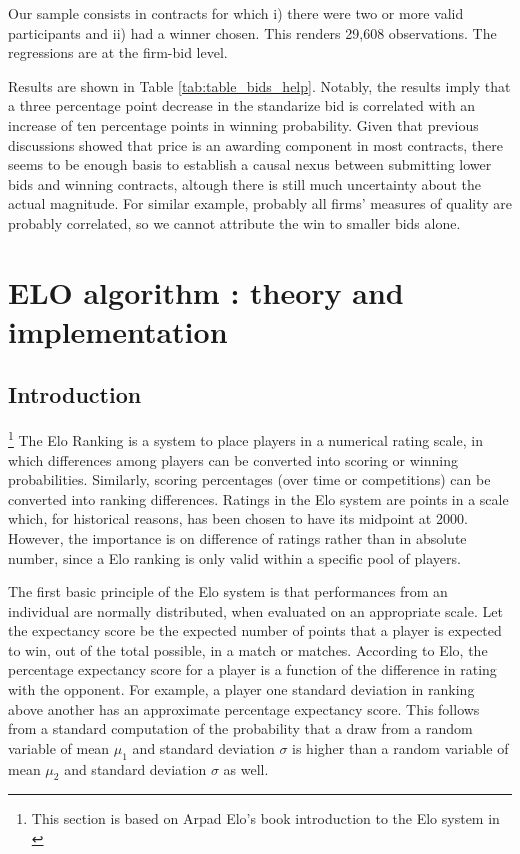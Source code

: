 Our sample consists in contracts for which i) there were two or more valid participants and ii) had a winner chosen. This renders 29,608 observations. The regressions are at the firm-bid level.

Results are shown in Table \ref{tab:table_bids_help}. Notably, the results imply that a three percentage point decrease in the standarize bid is correlated with an increase of ten percentage points in winning probability. Given that previous discussions showed that price is an awarding component in most contracts, there seems to be enough basis to establish a causal nexus between submitting lower bids and winning contracts, altough there is still much uncertainty about the actual magnitude. For similar  example, probably all firms' measures of quality are probably correlated, so we cannot attribute the win to smaller bids alone.



\clearpage
\section{ELO algorithm : theory and implementation}
\label{section:eloappendix}
\subsection{Introduction}\footnote{This section is based on Arpad Elo's book introduction to the Elo system in \citep{elo1978rating}}
The Elo Ranking is a system to place players in a numerical rating scale, in which differences among players can be converted into scoring or winning probabilities. Similarly, scoring percentages (over time or competitions) can be converted into ranking differences. Ratings in the Elo system are points in a scale which, for historical reasons, has been chosen to have its midpoint at 2000. However, the importance is on difference of ratings rather than in absolute number, since a Elo ranking is only valid within a specific pool of players.

The first basic principle of the Elo system is that performances from an individual are normally distributed, when evaluated on an appropriate scale. Let the expectancy score be the expected number of points that a player is expected to win, out of the total possible, in a match or matches. According to Elo, the percentage expectancy score for a player is a function of the difference in rating with the opponent. For example, a player one standard deviation in ranking above another has an approximate  percentage expectancy score. This follows from a standard computation of the probability that a draw from a random variable of mean $\mu_1$ and standard deviation $\sigma$ is higher than a random variable of mean $\mu_2$ and standard deviation $\sigma$ as well.

